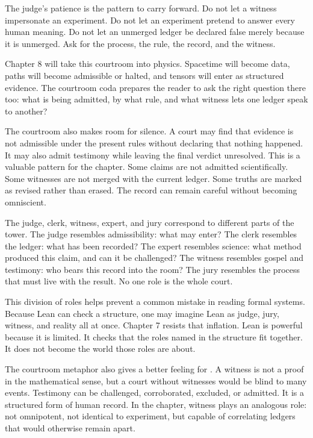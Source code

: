 The judge's patience is the pattern to carry forward. Do not let a witness
impersonate an experiment. Do not let an experiment pretend to answer every
human meaning. Do not let an unmerged ledger be declared false merely because
it is unmerged. Ask for the process, the rule, the record, and the witness.

Chapter 8 will take this courtroom into physics. Spacetime will become data,
paths will become admissible or halted, and tensors will enter as structured
evidence. The courtroom coda prepares the reader to ask the right question
there too: what is being admitted, by what rule, and what witness lets one
ledger speak to another?

The courtroom also makes room for silence. A court may find that evidence is
not admissible under the present rules without declaring that nothing happened.
It may also admit testimony while leaving the final verdict unresolved. This is
a valuable pattern for the chapter. Some claims are not admitted scientifically.
Some witnesses are not merged with the current ledger. Some truths are marked
as revised rather than erased. The record can remain careful without becoming
omniscient.

The judge, clerk, witness, expert, and jury correspond to different parts of
the tower. The judge resembles admissibility: what may enter? The clerk
resembles the ledger: what has been recorded? The expert resembles science:
what method produced this claim, and can it be challenged? The witness
resembles gospel and testimony: who bears this record into the room? The jury
resembles the process that must live with the result. No one role is the whole
court.

This division of roles helps prevent a common mistake in reading formal
systems. Because Lean can check a structure, one may imagine Lean as judge,
jury, witness, and reality all at once. Chapter 7 resists that inflation. Lean
is powerful because it is limited. It checks that the roles named in the
structure fit together. It does not become the world those roles are about.

The courtroom metaphor also gives a better feeling for . A
witness is not a proof in the mathematical sense, but a court without witnesses
would be blind to many events. Testimony can be challenged, corroborated,
excluded, or admitted. It is a structured form of human record. In the chapter,
witness plays an analogous role: not omnipotent, not identical to experiment,
but capable of correlating ledgers that would otherwise remain apart.


